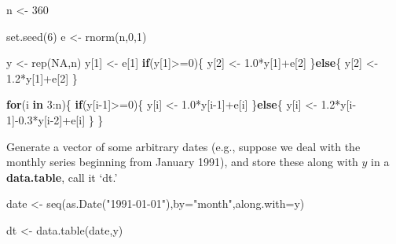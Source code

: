 \documentclass[
  12pt,
  oneside]{book}
\newenvironment{Shaded}{\begin{snugshade}}{\end{snugshade}}
\newcommand{\AttributeTok}[1]{\textcolor[rgb]{0.77,0.63,0.00}{#1}}
\newcommand{\ConstantTok}[1]{\textcolor[rgb]{0.00,0.00,0.00}{#1}}
\newcommand{\ControlFlowTok}[1]{\textcolor[rgb]{0.13,0.29,0.53}{\textbf{#1}}}
\newcommand{\DecValTok}[1]{\textcolor[rgb]{0.00,0.00,0.81}{#1}}
\newcommand{\FloatTok}[1]{\textcolor[rgb]{0.00,0.00,0.81}{#1}}
\newcommand{\FunctionTok}[1]{\textcolor[rgb]{0.00,0.00,0.00}{#1}}
\newcommand{\NormalTok}[1]{#1}
\newcommand{\OtherTok}[1]{\textcolor[rgb]{0.56,0.35,0.01}{#1}}
\newcommand{\SpecialCharTok}[1]{\textcolor[rgb]{0.00,0.00,0.00}{#1}}
\newcommand{\StringTok}[1]{\textcolor[rgb]{0.31,0.60,0.02}{#1}}
\begin{document}
\begin{Shaded}
\begin{Highlighting}[]
\NormalTok{n }\OtherTok{\textless{}{-}} \DecValTok{360}

\FunctionTok{set.seed}\NormalTok{(}\DecValTok{6}\NormalTok{)}
\NormalTok{e }\OtherTok{\textless{}{-}} \FunctionTok{rnorm}\NormalTok{(n,}\DecValTok{0}\NormalTok{,}\DecValTok{1}\NormalTok{)}

\NormalTok{y }\OtherTok{\textless{}{-}} \FunctionTok{rep}\NormalTok{(}\ConstantTok{NA}\NormalTok{,n)}
\NormalTok{y[}\DecValTok{1}\NormalTok{] }\OtherTok{\textless{}{-}}\NormalTok{ e[}\DecValTok{1}\NormalTok{]}
\ControlFlowTok{if}\NormalTok{(y[}\DecValTok{1}\NormalTok{]}\SpecialCharTok{\textgreater{}=}\DecValTok{0}\NormalTok{)\{}
\NormalTok{  y[}\DecValTok{2}\NormalTok{] }\OtherTok{\textless{}{-}}  \FloatTok{1.0}\SpecialCharTok{*}\NormalTok{y[}\DecValTok{1}\NormalTok{]}\SpecialCharTok{+}\NormalTok{e[}\DecValTok{2}\NormalTok{]}
\NormalTok{\}}\ControlFlowTok{else}\NormalTok{\{}
\NormalTok{  y[}\DecValTok{2}\NormalTok{] }\OtherTok{\textless{}{-}} \FloatTok{1.2}\SpecialCharTok{*}\NormalTok{y[}\DecValTok{1}\NormalTok{]}\SpecialCharTok{+}\NormalTok{e[}\DecValTok{2}\NormalTok{]}
\NormalTok{\}}

\ControlFlowTok{for}\NormalTok{(i }\ControlFlowTok{in} \DecValTok{3}\SpecialCharTok{:}\NormalTok{n)\{}
  \ControlFlowTok{if}\NormalTok{(y[i}\DecValTok{{-}1}\NormalTok{]}\SpecialCharTok{\textgreater{}=}\DecValTok{0}\NormalTok{)\{}
\NormalTok{    y[i] }\OtherTok{\textless{}{-}}  \FloatTok{1.0}\SpecialCharTok{*}\NormalTok{y[i}\DecValTok{{-}1}\NormalTok{]}\SpecialCharTok{+}\NormalTok{e[i]}
\NormalTok{  \}}\ControlFlowTok{else}\NormalTok{\{}
\NormalTok{    y[i] }\OtherTok{\textless{}{-}} \FloatTok{1.2}\SpecialCharTok{*}\NormalTok{y[i}\DecValTok{{-}1}\NormalTok{]}\SpecialCharTok{{-}}\FloatTok{0.3}\SpecialCharTok{*}\NormalTok{y[i}\DecValTok{{-}2}\NormalTok{]}\SpecialCharTok{+}\NormalTok{e[i]}
\NormalTok{  \}}
\NormalTok{\}}
\end{Highlighting}
\end{Shaded}

Generate a vector of some arbitrary dates (e.g., suppose we deal with the monthly series beginning from January 1991), and store these along with \(y\) in a \textbf{data.table}, call it `dt.'

\begin{Shaded}
\begin{Highlighting}[]
\NormalTok{date }\OtherTok{\textless{}{-}} \FunctionTok{seq}\NormalTok{(}\FunctionTok{as.Date}\NormalTok{(}\StringTok{"1991{-}01{-}01"}\NormalTok{),}\AttributeTok{by=}\StringTok{"month"}\NormalTok{,}\AttributeTok{along.with=}\NormalTok{y)}

\NormalTok{dt }\OtherTok{\textless{}{-}} \FunctionTok{data.table}\NormalTok{(date,y)}
\end{Highlighting}
\end{Shaded}
\end{document}
